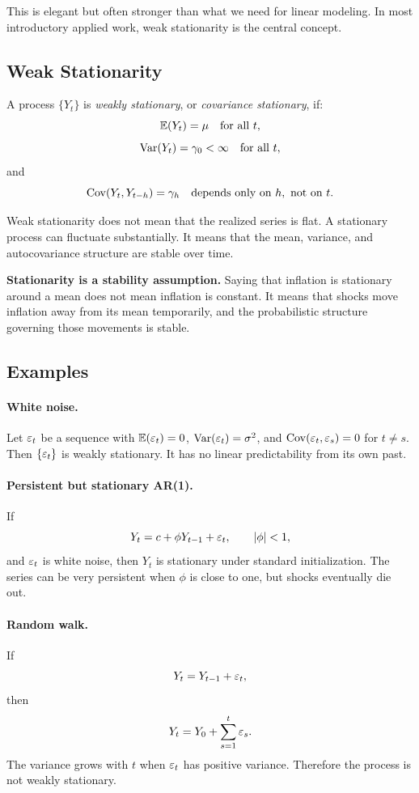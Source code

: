 This is elegant but often stronger than what we need for linear modeling. In most introductory applied work, weak stationarity is the central concept.

\subsection{Weak Stationarity}
\begin{defN}
A process $\{Y_t\}$ is \emph{weakly stationary}, or \emph{covariance stationary}, if:
\[
\mathbb{E}(Y_t)=\mu \quad \text{for all }t,
\]
\[
\operatorname{Var}(Y_t)=\gamma_0<\infty \quad \text{for all }t,
\]
and
\[
\operatorname{Cov}(Y_t,Y_{t-h})=\gamma_h
\quad \text{depends only on }h,\text{ not on }t.
\]
\end{defN}

Weak stationarity does not mean that the realized series is flat. A stationary process can fluctuate substantially. It means that the mean, variance, and autocovariance structure are stable over time.

\begin{boxD}
\textbf{Stationarity is a stability assumption.}
Saying that inflation is stationary around a mean does not mean inflation is constant. It means that shocks move inflation away from its mean temporarily, and the probabilistic structure governing those movements is stable.
\end{boxD}

\subsection{Examples}
\paragraph{White noise.}
Let $\varepsilon_t$ be a sequence with $\mathbb{E}(\varepsilon_t)=0$, $\operatorname{Var}(\varepsilon_t)=\sigma^2$, and $\operatorname{Cov}(\varepsilon_t,\varepsilon_s)=0$ for $t\neq s$. Then $\{\varepsilon_t\}$ is weakly stationary. It has no linear predictability from its own past.

\paragraph{Persistent but stationary AR(1).}
If
\[
Y_t=c+\phi Y_{t-1}+\varepsilon_t,
\qquad |\phi|<1,
\]
and $\varepsilon_t$ is white noise, then $Y_t$ is stationary under standard initialization. The series can be very persistent when $\phi$ is close to one, but shocks eventually die out.

\paragraph{Random walk.}
If
\[
Y_t=Y_{t-1}+\varepsilon_t,
\]
then
\[
Y_t=Y_0+\sum_{s=1}^t\varepsilon_s.
\]
The variance grows with $t$ when $\varepsilon_t$ has positive variance. Therefore the process is not weakly stationary.

